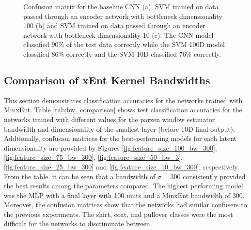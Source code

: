 \documentclass[conference]{IEEEtran}
\begin{document}
\begin{figure*}[h!]%
	\centering
	\caption{Confusion matrix for the baseline CNN (a), SVM trained on data passed through an encoder network with bottleneck dimensionality 100 (b) and SVM trained on data passed through an encoder network with bottleneck dimensionality 10 (c).  The CNN model classified 90\% of the test data correctly while the SVM 100D model classified 86\% correctly and the  SVM 10D classified 76\% correctly.}%
	\label{fig:step_1_conf_mat}%
\end{figure*}

 
\subsection{Comparison of xEnt Kernel Bandwidths} \label{bw_comparison}
This section demonstrates classification accuracies for the networks trained with MinxEnt.  Table \ref{tab:bw_comparison} shows test classification accuracies for the networks trained with different values for the parzen window estimator bandwidth and dimensionality of the smallest layer (before 10D final output).  Addtionally, confusion matrices for the best-performing models for each latent dimensionality are provided by Figures \ref{fig:feature_size_100_bw_300}, \ref{fig:feature_size_75_bw_300}, \ref{fig:feature_size_50_bw_3}, \ref{fig:feature_size_25_bw_300} and \ref{fig:feature_size_10_bw_300}, respectively. From the table, it can be seen that a bandwidth of $\sigma=300$ consistently provided the best results among the parameters compared. The highest performing model was the MLP with a final layer with  100 units and a MinxEnt bandwidth of 300.  Moreover, the confusion matrices show that the networks had similar confusers to the previous experiments.  The shirt, coat, and pullover classes were the most difficult for the networks to discriminate between.
\end{document}
